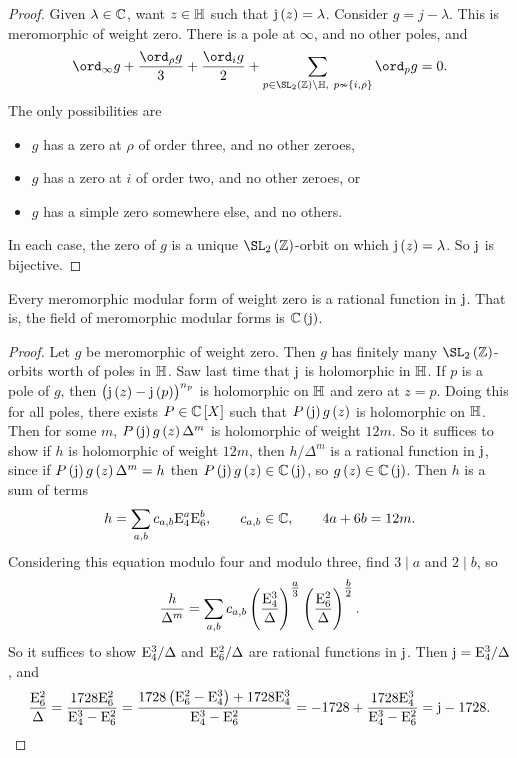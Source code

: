 \begin{proof}
Given $ \lambda \in \mathbb{C} $, want $ z \in \mathbb{H} $ such that $ \j\br{z} = \lambda $. Consider $ g = j - \lambda $. This is meromorphic of weight zero. There is a pole at $ \infty $, and no other poles, and
$$ \ord_\infty g + \dfrac{\ord_\rho g}{3} + \dfrac{\ord_i g}{2} + \sum_{p \in \SL_2\br{\ZZ} \backslash \HH, \ p \nsim \cbr{i, \rho}} \ord_p g = 0. $$
The only possibilities are
\begin{itemize}
\item $ g $ has a zero at $ \rho $ of order three, and no other zeroes,
\item $ g $ has a zero at $ i $ of order two, and no other zeroes, or
\item $ g $ has a simple zero somewhere else, and no others.
\end{itemize}
In each case, the zero of $ g $ is a unique $ \SL_2\br{\ZZ} $-orbit on which $ \j\br{z} = \lambda $. So $ \mathrm{j} $ is bijective.
\end{proof}


\begin{theorem}
Every meromorphic modular form of weight zero is a rational function in $ \mathrm{j} $. That is, the field of meromorphic modular forms is $ \CC\br{\j} $.
\end{theorem}

\begin{proof}
Let $ g $ be meromorphic of weight zero. Then $ g $ has finitely many $ \SL_2\br{\ZZ} $-orbits worth of poles in $ \mathbb{H} $. Saw last time that $ \mathrm{j} $ is holomorphic in $ \mathbb{H} $. If $ p $ is a pole of $ g $, then $ \br{\j\br{z} - \j\br{p}}^{n_p} $ is holomorphic on $ \mathbb{H} $ and zero at $ z = p $. Doing this for all poles, there exists $ P \in \CC\sbr{X} $ such that $ P\br{\j}g\br{z} $ is holomorphic on $ \mathbb{H} $. Then for some $ m $, $ P\br{\j}g\br{z}\Delta^m $ is holomorphic of weight $ 12m $. So it suffices to show if $ h $ is holomorphic of weight $ 12m $, then $ h / \Delta^m $ is a rational function in $ \mathrm{j} $, since if $ P\br{\j}g\br{z}\Delta^m = h $ then $ P\br{\j}g\br{z} \in \CC\br{\j} $, so $ g\br{z} \in \CC\br{\j} $. Then $ h $ is a sum of terms
$$ h = \sum_{a, b} c_{a, b}\mathrm{E}_4^a\mathrm{E}_6^b, \qquad c_{a, b} \in \mathbb{C}, \qquad 4a + 6b = 12m. $$
Considering this equation modulo four and modulo three, find $ 3 \mid a $ and $ 2 \mid b $, so
$$ \dfrac{h}{\Delta^m} = \sum_{a, b} c_{a, b}\br{\dfrac{\E_4^3}{\Delta}}^{\tfrac{a}{3}}\br{\dfrac{\E_6^2}{\Delta}}^{\tfrac{b}{2}}. $$
So it suffices to show $ \mathrm{E}_4^3 / \Delta $ and $ \mathrm{E}_6^2 / \Delta $ are rational functions in $ \mathrm{j} $. Then $ \mathrm{j} = \mathrm{E}_4^3 / \Delta $, and
$$ \dfrac{\E_6^2}{\Delta} = \dfrac{1728\E_6^2}{\E_4^3 - \E_6^2} = \dfrac{1728\br{\E_6^2 - \E_4^3} + 1728\E_4^3}{\E_4^3 - \E_6^2} = -1728 + \dfrac{1728\E_4^3}{\E_4^3 - \E_6^2} = \j - 1728. $$
\end{proof}

